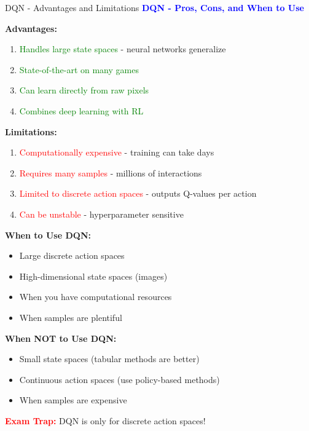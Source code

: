 \documentclass[8pt]{beamer}
\begin{document}
\begin{frame}{DQN - Advantages and Limitations}
\fontsize{6.5}{7.5}\selectfont
\textcolor{blue}{\textbf{DQN - Pros, Cons, and When to Use}}

\textbf{Advantages:}
\begin{enumerate}
\item \textcolor{green}{Handles large state spaces} - neural networks generalize
\item \textcolor{green}{State-of-the-art on many games}
\item \textcolor{green}{Can learn directly from raw pixels}
\item \textcolor{green}{Combines deep learning with RL}
\end{enumerate}

\textbf{Limitations:}
\begin{enumerate}
\item \textcolor{red}{Computationally expensive} - training can take days
\item \textcolor{red}{Requires many samples} - millions of interactions
\item \textcolor{red}{Limited to discrete action spaces} - outputs Q-values per action
\item \textcolor{red}{Can be unstable} - hyperparameter sensitive
\end{enumerate}

\textbf{When to Use DQN:}
\begin{itemize}
\item Large discrete action spaces
\item High-dimensional state spaces (images)
\item When you have computational resources
\item When samples are plentiful
\end{itemize}

\textbf{When NOT to Use DQN:}
\begin{itemize}
\item Small state spaces (tabular methods are better)
\item Continuous action spaces (use policy-based methods)
\item When samples are expensive
\end{itemize}

\textcolor{red}{\textbf{Exam Trap:}} DQN is only for discrete action spaces!
\end{frame}
\end{document}
